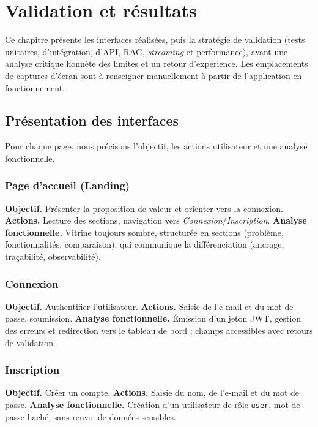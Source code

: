 \chapter{Validation et résultats}
\label{chap:validation}

Ce chapitre présente les interfaces réalisées, puis la stratégie de validation
(tests unitaires, d'intégration, d'API, RAG, \emph{streaming} et performance),
avant une analyse critique honnête des limites et un retour d'expérience. Les
emplacements de captures d'écran sont à renseigner manuellement à partir de
l'application en fonctionnement.

\section{Présentation des interfaces}
Pour chaque page, nous précisons l'objectif, les actions utilisateur et une
analyse fonctionnelle.

\subsection{Page d'accueil (Landing)}
\textbf{Objectif.} Présenter la proposition de valeur et orienter vers la
connexion. \textbf{Actions.} Lecture des sections, navigation vers
\emph{Connexion}/\emph{Inscription}. \textbf{Analyse fonctionnelle.} Vitrine
toujours sombre, structurée en sections (problème, fonctionnalités, comparaison),
qui communique la différenciation (ancrage, traçabilité, observabilité).

\subsection{Connexion}
\textbf{Objectif.} Authentifier l'utilisateur. \textbf{Actions.} Saisie de
l'e-mail et du mot de passe, soumission. \textbf{Analyse fonctionnelle.} Émission
d'un jeton JWT, gestion des erreurs et redirection vers le tableau de bord ;
champs accessibles avec retours de validation.

\subsection{Inscription}
\textbf{Objectif.} Créer un compte. \textbf{Actions.} Saisie du nom, de l'e-mail
et du mot de passe. \textbf{Analyse fonctionnelle.} Création d'un utilisateur de
rôle \texttt{user}, mot de passe haché, sans renvoi de données sensibles.

